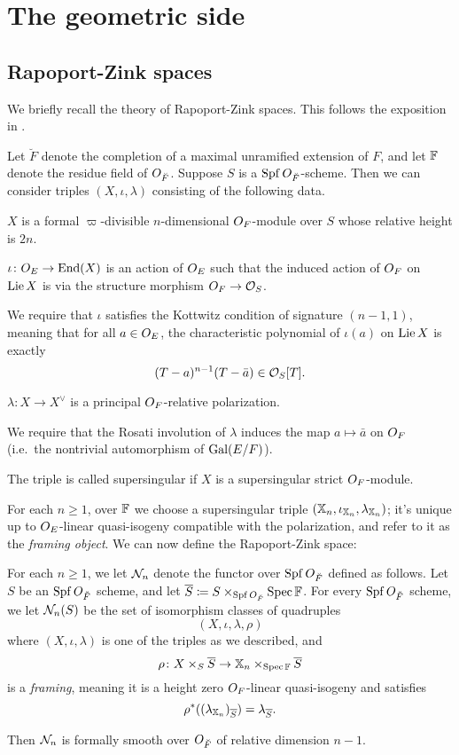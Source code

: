 \chapter{The geometric side}
\label{ch:geo}

\section{Rapoport-Zink spaces}
We briefly recall the theory of Rapoport-Zink spaces.
This follows the exposition in \cite[\S4.1]{ref:survey}.

Let $\breve F$ denote the completion of a maximal unramified extension of $F$,
and let $\mathbb F$ denote the residue field of $O_{\breve F}$.
Suppose $S$ is a $\operatorname{Spf} O_{\breve F}$-scheme.
Then we can consider triples $(X, \iota, \lambda)$ consisting of the following data.
\begin{itemize}
  \ii $X$ is a formal $\varpi$-divisible $n$-dimensional $O_F$-module over $S$
  whose relative height is $2n$.

  \ii $\iota \colon O_E \to \operatorname{End}(X)$ is an action of $O_E$
  such that the induced action of $O_F$ on $\operatorname{Lie} X$
  is via the structure morphism $O_F \to \mathcal{O}_S$.

  We require that $\iota$ satisfies the Kottwitz condition of signature $(n-1,1)$,
  meaning that for all $a \in O_E$,
  the characteristic polynomial of $\iota(a)$ on $\operatorname{Lie} X$
  is exactly \[ (T-a)^{n-1} (T-\bar a) \in \mathcal{O}_S[T]. \]

  \ii $\lambda \colon X \to X^\vee$ is a principal $O_F$-relative polarization.

  We require that the Rosati involution of $\lambda$
  induces the map $a \mapsto \bar a$ on $O_F$
  (i.e.\ the nontrivial automorphism of $\operatorname{Gal}(E/F)$).
\end{itemize}
The triple is called supersingular if $X$ is a supersingular strict $O_F$-module.

For each $n \ge 1$, over $\mathbb F$
we choose a supersingular triple $(\mathbb X_n, \iota_{\mathbb X_n}, \lambda_{\mathbb X_n})$;
it's unique up to $O_E$-linear quasi-isogeny compatible with the polarization,
and refer to it as the \emph{framing object}.
We can now define the Rapoport-Zink space:
\begin{definition}
  For each $n \ge 1$, we let $\mathcal N_n$ denote the
  functor over $\operatorname{Spf} O_{\breve F}$ defined as follows.
  Let $S$ be an $\operatorname{Spf} O_{\breve F}$ scheme, and let
  $\overline S \coloneqq S \times_{\operatorname{Spf} O_{\breve F}} \operatorname{Spec} \mathbb F$.
  For every $\operatorname{Spf} O_{\breve F}$ scheme, we let $\mathcal N_n(S)$
  be the set of isomorphism classes of quadruples
  \[ (X, \iota, \lambda, \rho) \]
  where $(X, \iota, \lambda)$ is one of the triples as we described, and
  \[ \rho \colon X \times_S \overline S \to \mathbb X_n \times_{\operatorname{Spec} \mathbb F} \overline S \]
  is a \emph{framing}, meaning it is a height zero $O_F$-linear quasi-isogeny
  and satisfies
  \[ \rho^\ast((\lambda_{\mathbb X_n})_{\overline S}) = \lambda_{\overline S}. \]
\end{definition}
Then $\mathcal N_n$ is formally smooth over $O_{\breve F}$ of relative dimension $n-1$.

